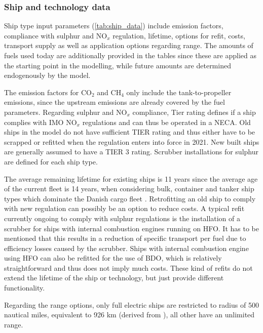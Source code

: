 \documentclass[article]{elsarticle}
\begin{document}
\subsubsection{Ship and technology data}
Ship type input parameters (\autoref{tab:ship_data}) include emission factors, compliance with sulphur and NO$_x$ regulation, lifetime, options for refit, costs, transport supply as well as application options regarding range. The amounts of fuels used today are additionally provided in the tables since these are applied as the starting point in the modelling, while future amounts are determined endogenously by the model.

The emission factors for CO$_2$ and CH$_4$ only include the tank-to-propeller emissions, since the upstream emissions are already covered by the fuel parameters. Regarding sulphur and NO$_x$ compliance, Tier rating defines if a ship complies with IMO NO$_x$ regulations and can thus be operated in a NECA. Old ships in the model do not have sufficient TIER rating and thus either have to be scrapped or refitted when the regulation enters into force in 2021. New built ships are generally assumed to have a TIER 3 rating. Scrubber installations for sulphur are defined for each ship type.

The average remaining lifetime for existing ships is 11 years since the average age of the current fleet is 14 years, when considering bulk, container and tanker ship types which dominate the Danish cargo fleet \cite[Tab.~2.2, p.~27]{UNCTAD2017}. Retrofitting an old ship to comply with new regulation can possibly be an option to reduce costs. A typical refit currently ongoing to comply with sulphur regulations is the installation of a scrubber for ships with internal combustion engines running on HFO. It has to be mentioned that this results in a reduction of specific transport per fuel due to efficiency losses caused by the scrubber. Ships with internal combustion engine using HFO can also be refitted for the use of BDO, which is relatively straightforward and thus does not imply much costs. These kind of refits do not extend the lifetime of the ship or technology, but just provide different functionality.

Regarding the range options, only full electric ships are restricted to radius of 500 nautical miles, equivalent to 926 km (derived from \cite{Stensvold2018a}), all other have an unlimited range.
\end{document}
